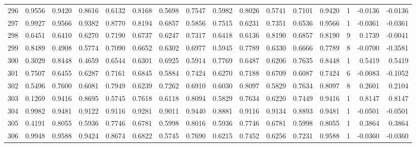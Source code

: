 \begin{tabular}{lrrrrrrrrrrrrrrr}
296 &      0.9556 &  0.9420 &  0.8616 &  0.6132 &  0.8168 &  0.5698 &  0.7547 &  0.5982 &  0.8026 &  0.5741 &   0.7101 &     0.9420 &      1 &                   -0.0136 &                    -0.0136 \\
297 &      0.9927 &  0.9566 &  0.9382 &  0.8770 &  0.8194 &  0.6857 &  0.5856 &  0.7515 &  0.6231 &  0.7351 &   0.6536 &     0.9566 &      1 &                   -0.0361 &                    -0.0361 \\
298 &      0.6451 &  0.6410 &  0.6270 &  0.7190 &  0.6737 &  0.6247 &  0.7317 &  0.6418 &  0.6136 &  0.8190 &   0.6857 &     0.8190 &      9 &                    0.1739 &                    -0.0041 \\
299 &      0.8489 &  0.4908 &  0.5774 &  0.7090 &  0.6652 &  0.6302 &  0.6977 &  0.5945 &  0.7789 &  0.6330 &   0.6666 &     0.7789 &      8 &                   -0.0700 &                    -0.3581 \\
300 &      0.3029 &  0.8448 &  0.4659 &  0.6544 &  0.6301 &  0.6925 &  0.5914 &  0.7769 &  0.6487 &  0.6206 &   0.7635 &     0.8448 &      1 &                    0.5419 &                     0.5419 \\
301 &      0.7507 &  0.6455 &  0.6287 &  0.7161 &  0.6845 &  0.5884 &  0.7424 &  0.6270 &  0.7188 &  0.6709 &   0.6087 &     0.7424 &      6 &                   -0.0083 &                    -0.1052 \\
302 &      0.5496 &  0.7600 &  0.6081 &  0.7949 &  0.6239 &  0.7262 &  0.6910 &  0.6030 &  0.8097 &  0.5829 &   0.7634 &     0.8097 &      8 &                    0.2601 &                     0.2104 \\
303 &      0.1269 &  0.9416 &  0.8695 &  0.5745 &  0.7618 &  0.6118 &  0.8094 &  0.5829 &  0.7634 &  0.6220 &   0.7449 &     0.9416 &      1 &                    0.8147 &                     0.8147 \\
304 &      0.9982 &  0.9481 &  0.9122 &  0.9116 &  0.9281 &  0.9011 &  0.9440 &  0.8881 &  0.9116 &  0.9134 &   0.8893 &     0.9481 &      1 &                   -0.0501 &                    -0.0501 \\
305 &      0.4191 &  0.8055 &  0.5936 &  0.7746 &  0.6781 &  0.5998 &  0.8016 &  0.5936 &  0.7746 &  0.6781 &   0.5998 &     0.8055 &      1 &                    0.3864 &                     0.3864 \\
306 &      0.9948 &  0.9588 &  0.9424 &  0.8674 &  0.6822 &  0.5745 &  0.7690 &  0.6215 &  0.7452 &  0.6256 &   0.7231 &     0.9588 &      1 &                   -0.0360 &                    -0.0360 \\

\end{tabular}
